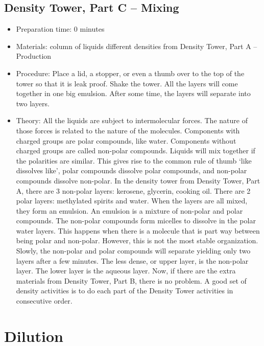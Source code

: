 \subsection{Density Tower, Part C -- Mixing}
\begin{itemize}
\item{Preparation time: 0 minutes}
\item{Materials: column of liquids different densities from Density Tower, Part A -- Production}
\item{Procedure: Place a lid, a stopper, or even a thumb over to the top of the tower so that it is leak proof. Shake the tower. All the layers will come together in one big emulsion. After some time, the layers will separate into two layers.}
\item{Theory: All the liquids are subject to intermolecular forces. The nature of those forces is related to the nature of the molecules. Components with charged groups are polar compounds, like water. Components without charged groups are called non-polar compounds. Liquids will mix together if the polarities are similar. This gives rise to the common rule of thumb ‘like dissolves like’, polar compounds dissolve polar compounds, and non-polar compounds dissolve non-polar. In the density tower from Density Tower, Part A, there are 3 non-polar layers: kerosene, glycerin, cooking oil. There are 2 polar layers: methylated spirits and water. When the layers are all mixed, they form an emulsion. An emulsion is a mixture of non-polar and polar compounds. The non-polar compounds form micelles to dissolve in the polar water layers. This happens when there is a molecule that is part way between being polar and non-polar. However, this is not the most stable organization. Slowly, the non-polar and polar compounds will separate yielding only two layers after a few minutes. The less dense, or upper layer, is the non-polar layer. The lower layer is the aqueous layer. Now, if there are the extra materials from Density Tower, Part B, there is no problem. A good set of density activities is to do each part of the Density Tower activities in consecutive order.}
\end{itemize}

\section{Dilution}

